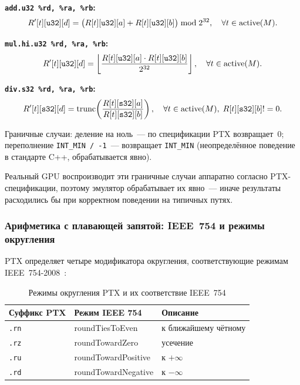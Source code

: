 \textbf{\texttt{add.u32 \%rd, \%ra, \%rb}:}
\begin{equation}
  R'[t][\mathtt{u32}][d] =
  \bigl(R[t][\mathtt{u32}][a] + R[t][\mathtt{u32}][b]\bigr) \bmod 2^{32},
  \quad \forall t \in \mathrm{active}(M).
\end{equation}

\textbf{\texttt{mul.hi.u32 \%rd, \%ra, \%rb}:}
\begin{equation}
  R'[t][\mathtt{u32}][d] =
  \left\lfloor \frac{R[t][\mathtt{u32}][a] \cdot R[t][\mathtt{u32}][b]}{2^{32}} \right\rfloor,
  \quad \forall t \in \mathrm{active}(M).
\end{equation}

\textbf{\texttt{div.s32 \%rd, \%ra, \%rb}:}
\begin{equation}
  R'[t][\mathtt{s32}][d] =
  \mathrm{trunc}\!\left(\frac{R[t][\mathtt{s32}][a]}{R[t][\mathtt{s32}][b]}\right),
  \quad \forall t \in \mathrm{active}(M),\; R[t][\mathtt{s32}][b] != 0.
\end{equation}

Граничные случаи: деление на ноль~--- по спецификации PTX возвращает~0;
переполнение \texttt{INT\_MIN / -1}~--- возвращает \texttt{INT\_MIN}
(неопределённое поведение в стандарте C++, обрабатывается явно).

Реальный GPU воспроизводит эти граничные случаи аппаратно согласно
PTX-спецификации, поэтому эмулятор обрабатывает их явно~--- иначе
результаты расходились бы при корректном поведении на типичных путях.

\subsubsection{Арифметика с плавающей запятой: IEEE~754 и режимы округления}

PTX определяет четыре модификатора округления, соответствующие
режимам IEEE~754-2008~\cite{IEEE754-2008}:

\begin{table}[h]
  \caption{Режимы округления PTX и их соответствие IEEE~754}
  \label{tab:rounding}
  \centering
  \begin{tabular}{lll}
    \toprule
    \textbf{Суффикс PTX} & \textbf{Режим IEEE 754} & \textbf{Описание} \\
    \midrule
    \texttt{.rn} & roundTiesToEven  & к ближайшему чётному \\
    \texttt{.rz} & roundTowardZero  & усечение \\
    \texttt{.ru} & roundTowardPositive & к $+\infty$ \\
    \texttt{.rd} & roundTowardNegative & к $-\infty$ \\
    \bottomrule
  \end{tabular}
\end{table}

